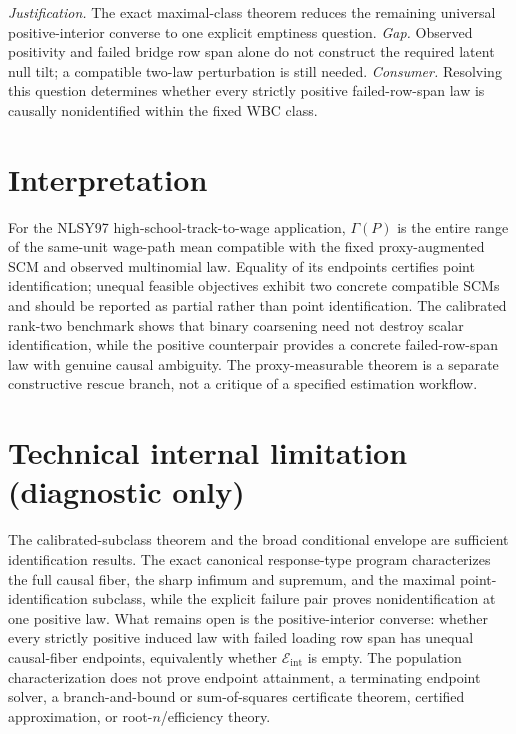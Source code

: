 \documentclass{article}
\begin{document}
\par\smallskip\noindent \textit{Justification.} The exact maximal-class theorem reduces the remaining universal positive-interior converse to one explicit emptiness question. \textit{Gap.} Observed positivity and failed bridge row span alone do not construct the required latent null tilt; a compatible two-law perturbation is still needed. \textit{Consumer.} Resolving this question determines whether every strictly positive failed-row-span law is causally nonidentified within the fixed WBC class.

\section{Interpretation}

For the NLSY97 high-school-track-to-wage application, \(\Gamma(P)\) is the entire range of the same-unit wage-path mean compatible with the fixed proxy-augmented SCM and observed multinomial law. Equality of its endpoints certifies point identification; unequal feasible objectives exhibit two concrete compatible SCMs and should be reported as partial rather than point identification. The calibrated rank-two benchmark shows that binary coarsening need not destroy scalar identification, while the positive counterpair provides a concrete failed-row-span law with genuine causal ambiguity. The proxy-measurable theorem is a separate constructive rescue branch, not a critique of a specified estimation workflow.

\section*{Technical internal limitation (diagnostic only)}

The calibrated-subclass theorem and the broad conditional envelope are sufficient identification results. The exact canonical response-type program characterizes the full causal fiber, the sharp infimum and supremum, and the maximal point-identification subclass, while the explicit failure pair proves nonidentification at one positive law. What remains open is the positive-interior converse: whether every strictly positive induced law with failed loading row span has unequal causal-fiber endpoints, equivalently whether \(\mathcal E_{\mathrm{int}}\) is empty. The population characterization does not prove endpoint attainment, a terminating endpoint solver, a branch-and-bound or sum-of-squares certificate theorem, certified approximation, or root-\(n\)/efficiency theory.
\end{document}
